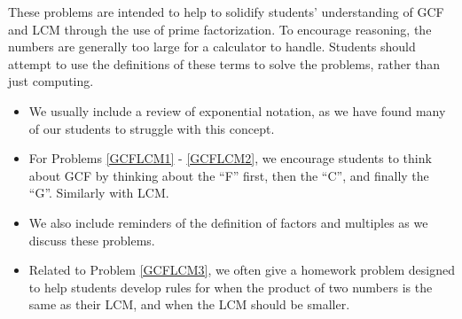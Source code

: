\documentclass[nooutcomes]{ximera}
\begin{document}
\begin{instructorNotes}
These problems are intended to help to solidify students' understanding of GCF and LCM through the use of prime factorization.  To encourage reasoning, the numbers are generally too large for a calculator to handle.  Students should attempt to use the definitions of these terms to solve the problems, rather than just computing.

\begin{itemize}
    \item We usually include a review of exponential notation, as we have found many of our students to struggle with this concept.
	\item For Problems \ref{GCFLCM1} - \ref{GCFLCM2}, we encourage students to think about GCF by thinking about the ``F'' first, then the ``C'', and finally the ``G''.  Similarly with LCM.
	\item We also include reminders of the definition of factors and multiples as we discuss these problems.
	\item Related to Problem \ref{GCFLCM3}, we often give a homework problem designed to help students develop rules for when the product of two numbers is the same as their LCM, and when the LCM should be smaller. %
\end{itemize}

\end{instructorNotes}
\end{document}
